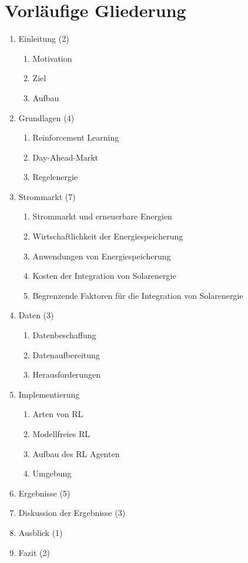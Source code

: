 \documentclass[a4paper, 11pt]{article}
\begin{document}
\section{Vorläufige Gliederung}

\label{structure}

\begin{enumerate}
	\item Einleitung (2)
	\begin{enumerate}
		\item Motivation
          \item Ziel
		\item Aufbau
	\end{enumerate}
 \item Grundlagen (4)
 \begin{enumerate}
     \item Reinforcement Learning
     \item Day-Ahead-Markt
     \item Regelenergie
 \end{enumerate}
 \item Strommarkt (7)
 \begin{enumerate}
     \item Strommarkt und erneuerbare Energien
     \item Wirtschaftlichkeit der Energiespeicherung
     \item Anwendungen von Energiespeicherung
     \item Kosten der Integration von Solarenergie
     \item Begrenzende Faktoren für die Integration von Solarenergie
 \end{enumerate}
 \item Daten (3)
 \begin{enumerate}
     \item Datenbeschaffung
     \item Datenaufbereitung
     \item Herausforderungen
 \end{enumerate}
 \item Implementierung
 \begin{enumerate}
     \item Arten von RL
     \item Modellfreies RL
     \item Aufbau des RL Agenten
     \item Umgebung
 \end{enumerate}
 \item Ergebnisse (5)
\item Diskussion der Ergebnisse (3)
\item Ausblick (1)
\item Fazit (2)
\end{enumerate}
\newpage
\end{document}
